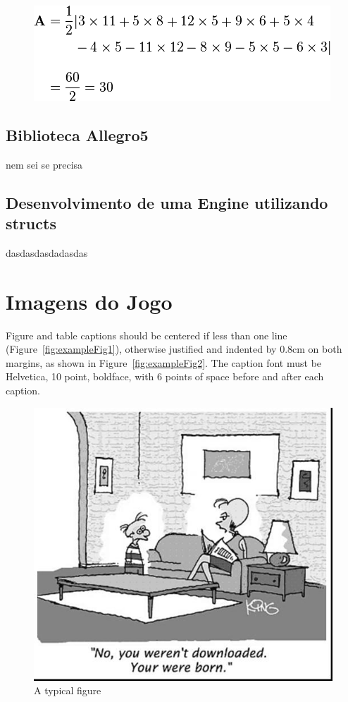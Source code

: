 \documentclass[12pt]{article}
\begin{document}
\begin{center}
\begin{figure}
\includegraphics[width=.7\textwidth]{equacao6.png}
\label{fig:fig}
\end{figure}
\end{center}


\subsection{Biblioteca Allegro5}

nem sei se precisa

\subsection{Desenvolvimento de uma Engine utilizando structs}

dasdasdasdadasdas

\section{Imagens do Jogo}\label{sec:figs}


Figure and table captions should be centered if less than one line
(Figure~\ref{fig:exampleFig1}), otherwise justified and indented by 0.8cm on
both margins, as shown in Figure~\ref{fig:exampleFig2}. The caption font must
be Helvetica, 10 point, boldface, with 6 points of space before and after each
caption.

\begin{figure}[ht]
\centering
\includegraphics[width=.5\textwidth]{fig1.jpg}
\caption{A typical figure}
\label{fig:fig}
\end{figure}
\end{document}
